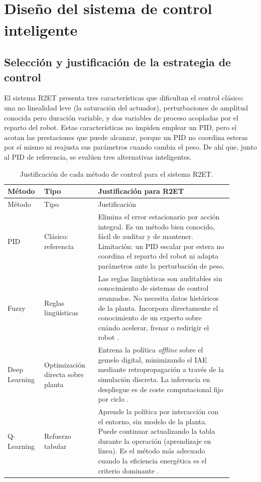 \chapter[Diseño del control inteligente]{Diseño del sistema de control inteligente\textsuperscript{\normalfont *}}
\label{ch:diseno}
\begingroup\renewcommand\thefootnote{*}\renewcommand{}\endgroup

\section{Selección y justificación de la estrategia de control}

El sistema R2ET presenta tres características que dificultan el control clásico: una no linealidad leve (la saturación del actuador), perturbaciones de amplitud conocida pero duración variable, y dos variables de proceso acopladas por el reparto del robot. Estas características no impiden emplear un PID, pero sí acotan las prestaciones que puede alcanzar, porque un PID no coordina esteras por sí mismo ni reajusta sus parámetros cuando cambia el peso. De ahí que, junto al PID de referencia, se evalúen tres alternativas inteligentes.

\begin{longtable}{@{}P{0.12\linewidth}P{0.22\linewidth}P{0.55\linewidth}@{}}
\caption{Justificación de cada método de control para el sistema R2ET.}
\label{tab:justificacion}\\
\toprule
Método & Tipo & Justificación para R2ET \\ \midrule \endfirsthead
\toprule Método & Tipo & Justificación \\ \midrule \endhead
PID & Clásico: referencia & Elimina el error estacionario por acción integral. Es un método bien conocido, fácil de auditar y de mantener. Limitación: un PID escalar por estera no coordina el reparto del robot ni adapta parámetros ante la perturbación de peso.\\[4pt]
Fuzzy & Reglas lingüísticas & Las reglas lingüísticas son auditables sin conocimiento de sistemas de control avanzados. No necesita datos históricos de la planta. Incorpora directamente el conocimiento de un experto sobre cuándo acelerar, frenar o redirigir el robot \cite{ross2010fuzzy,kasabov1996foundations}.\\[4pt]
Deep Learning & Optimización directa sobre planta & Entrena la política \emph{offline} sobre el gemelo digital, minimizando el IAE mediante retropropagación a través de la simulación discreta. La inferencia en despliegue es de coste computacional fijo por ciclo \cite{kasabov1996foundations}.\\[4pt]
Q-Learning & Refuerzo tabular & Aprende la política por interacción con el entorno, sin modelo de la planta. Puede continuar actualizando la tabla durante la operación (aprendizaje en línea). Es el método más adecuado cuando la eficiencia energética es el criterio dominante \cite{sutton2018reinforcement}.\\
\bottomrule
\end{longtable}

